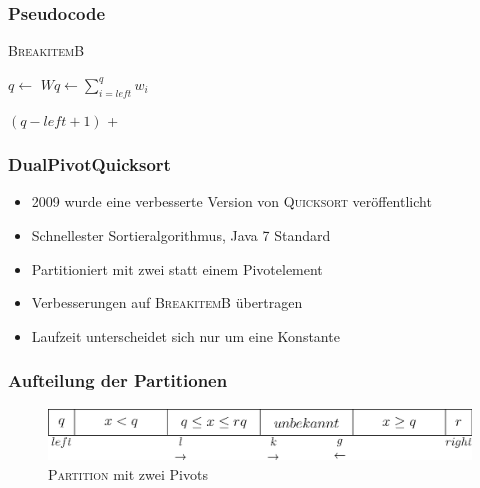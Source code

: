 \documentclass{presentation}
\begin{document}
\begin{frame}[fragile]
    \frametitle{Pseudocode}
    \textsc{\large BreakitemB}
    \begin{algorithmic}[1]
            \State $q \gets $ 
            \State $Wq \gets \sum_{i=left}^{q} w_i$
            \pause

                \State \Return {}
            \pause
            \Else
                \State \Return $(q-left+1)$ + 
            \EndIf
        \EndIf
        \pause

        \State {}
    \end{algorithmic}
\end{frame}



\begin{frame}
    \frametitle{DualPivotQuicksort}
    \begin{itemize}
        \item 2009 wurde eine verbesserte Version von \textsc{Quicksort} veröffentlicht
        \item Schnellester Sortieralgorithmus, Java 7 Standard
        \item Partitioniert mit zwei statt einem Pivotelement
        \item Verbesserungen auf \textsc{BreakitemB} übertragen
        \item Laufzeit unterscheidet sich nur um eine Konstante
    \end{itemize}
\end{frame}



\begin{frame}
    \frametitle{Aufteilung der Partitionen}
    \begin{figure}[!htb]
        \centering
        \includegraphics[scale=.5]{res/partition2.eps}
        \caption{\textsc{Partition} mit zwei Pivots}
        \label{fig:partition2}
    \end{figure}
\end{frame}
\end{document}
